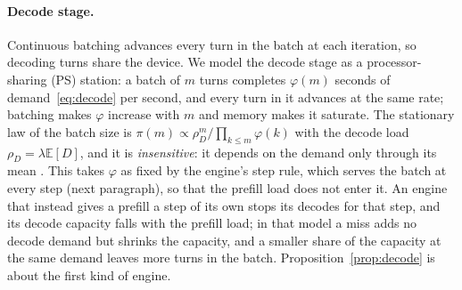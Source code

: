 \documentclass{article}
\newcommand{\leanref}[1]{}
\newcommand{\provedby}[1]{}
\theoremstyle{plain}
\theoremstyle{definition}
\theoremstyle{remark}
\newcommand{\E}{\mathbb{E}}
\begin{document}
\paragraph{Decode stage.} Continuous batching advances every turn in
the batch at each iteration, so decoding turns share the device. We
model the decode stage as a processor-sharing (PS) station: a batch of
$m$ turns completes $\varphi(m)$ seconds of demand~\eqref{eq:decode} per
second, and every turn in it advances at the same rate; batching makes
$\varphi$ increase with $m$ and memory makes it saturate. The
stationary law of the batch size is
$\pi(m)\propto\rho_D^m/\prod_{k\le m}\varphi(k)$ with the decode load
$\rho_D=\lambda\E[D]$, and it is \emph{insensitive}: it depends on the
demand only through its mean \citep{bcmp1975,kelly1979}. This takes
$\varphi$ as fixed by the engine's step rule, which serves the batch at
every step (next paragraph), so that the prefill load does not enter it.
An engine that instead gives a prefill a step of its own stops its
decodes for that step, and its decode capacity falls with the prefill
load; in that model a miss adds no decode demand but shrinks the
capacity, and a smaller share of the capacity at the same demand leaves
more turns in the
batch.\provedby{\leanref{psMeanNumber\_anti\_share}, \leanref{psNum\_anti\_capacity}, \leanref{decode\_share\_loss}}
Proposition~\ref{prop:decode} is about the first kind of engine.
\end{document}
